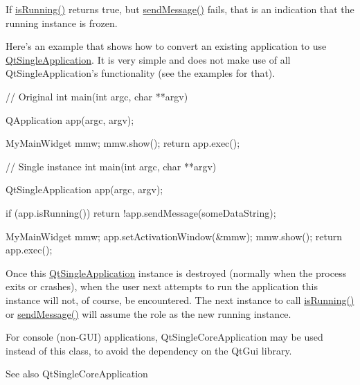 If \hyperlink{class_qt_single_application_aa9f0e6e4f18ac79bbb7a955cd860894d}{isRunning()} returns true, but \hyperlink{class_qt_single_application_a0e2f3900f0290913c738ec6b4b959922}{sendMessage()} fails, that is an indication that the running instance is frozen.

Here's an example that shows how to convert an existing application to use \hyperlink{class_qt_single_application}{QtSingleApplication}. It is very simple and does not make use of all QtSingleApplication's functionality (see the examples for that).


\begin{DoxyCode}
    // Original
    int main(int argc, char **argv)
    {
        QApplication app(argc, argv);

        MyMainWidget mmw;
        mmw.show();
        return app.exec();
    }

    // Single instance
    int main(int argc, char **argv)
    {
        QtSingleApplication app(argc, argv);

        if (app.isRunning())
            return !app.sendMessage(someDataString);

        MyMainWidget mmw;
        app.setActivationWindow(&mmw);
        mmw.show();
        return app.exec();
    }
\end{DoxyCode}


Once this \hyperlink{class_qt_single_application}{QtSingleApplication} instance is destroyed (normally when the process exits or crashes), when the user next attempts to run the application this instance will not, of course, be encountered. The next instance to call \hyperlink{class_qt_single_application_aa9f0e6e4f18ac79bbb7a955cd860894d}{isRunning()} or \hyperlink{class_qt_single_application_a0e2f3900f0290913c738ec6b4b959922}{sendMessage()} will assume the role as the new running instance.

For console (non-\/GUI) applications, QtSingleCoreApplication may be used instead of this class, to avoid the dependency on the QtGui library.

\begin{DoxySeeAlso}{See also}
QtSingleCoreApplication 
\end{DoxySeeAlso}


